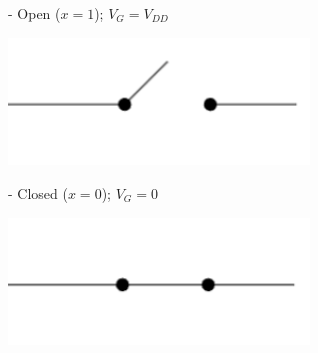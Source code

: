 \documentclass[12pt,openany]{book}
\begin{document}
			      		\begin{minipage}{0.45\textwidth}
						- Open ($x=1$); $V_{G} = V_{DD}$
						\begin{center}
							\includegraphics[width=0.6\textwidth]{circuits/9.1.1_4.png}
						\end{center}
						\vspace*{20px}
						- Closed ($x=0$); $V_{G} = 0$
						\begin{center}
							\includegraphics[width=0.6\textwidth]{circuits/9.1.1_5.png}
						\end{center}
			      		\end{minipage}%
						\hfill
						\vline
						\hfill
\end{document}
